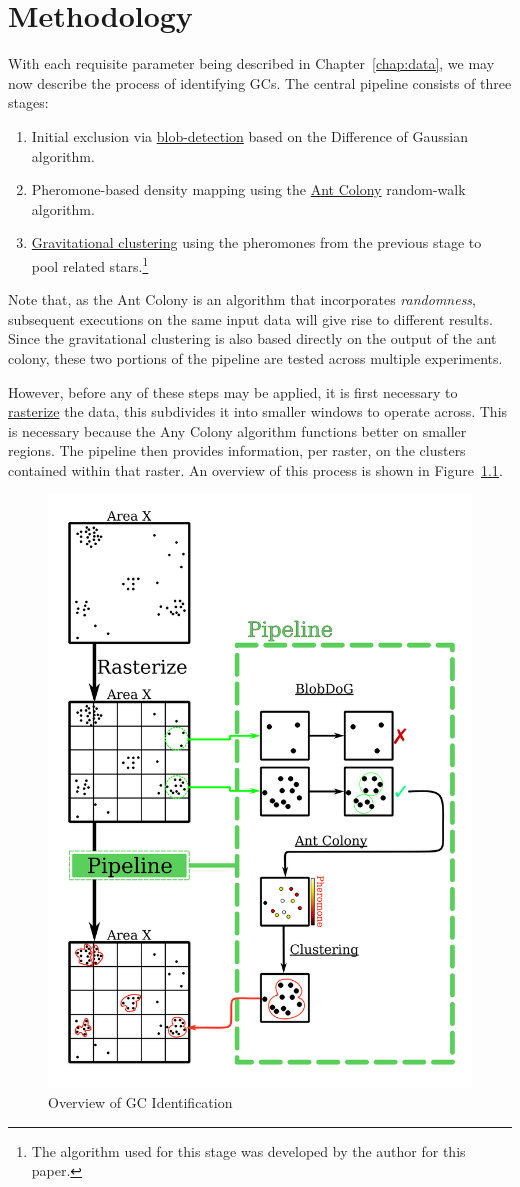 \chapter{\label{chap:methodology}Methodology}

With each requisite parameter being described in
Chapter~\ref{chap:data}, we may now describe the process of identifying
GCs. The central pipeline consists of three stages:
\begin{enumerate}
    \item Initial exclusion via \hyperref[sec:DoG]{blob-detection} based on the Difference of Gaussian algorithm.
    \item Pheromone-based density mapping using the \hyperref[sec:Ant]{Ant Colony} random-walk algorithm.
    \item \hyperref[sec:Clustering]{Gravitational clustering} using the pheromones from the previous stage to pool related stars.\footnote{The algorithm used for this stage was developed by the author for this paper.}
\end{enumerate}
Note that, as the Ant Colony is an algorithm that incorporates \textit{randomness}, subsequent executions on the same input data will give rise to different results. Since the gravitational clustering is also based directly on the output of the ant colony, these two portions of the pipeline are tested across multiple experiments.

However, before any of these steps may be applied, it is first necessary to \hyperref[sec:rasterization]{rasterize} the data, this subdivides it into
smaller windows to operate across. This is necessary because the Any Colony algorithm functions better on smaller regions. The pipeline then provides information, per
raster, on the clusters contained within that raster. An overview of this
process is shown in Figure~\ref{fig:pipeline-visualization}.
\begin{figure}[H]
    \centering
    \includegraphics[height=0.75\textwidth]{figures/graphics/pipeline.png}
    \caption{\label{fig:pipeline-visualization} Overview of GC Identification}
\end{figure}
\newpage{}
